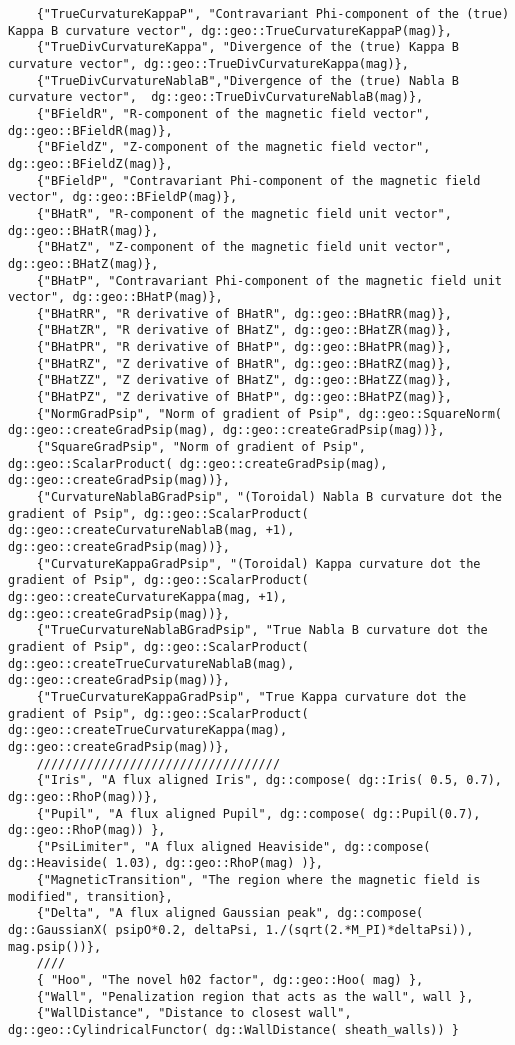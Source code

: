 \begin{verbatim}
    {"TrueCurvatureKappaP", "Contravariant Phi-component of the (true) Kappa B curvature vector", dg::geo::TrueCurvatureKappaP(mag)},
    {"TrueDivCurvatureKappa", "Divergence of the (true) Kappa B curvature vector", dg::geo::TrueDivCurvatureKappa(mag)},
    {"TrueDivCurvatureNablaB","Divergence of the (true) Nabla B curvature vector",  dg::geo::TrueDivCurvatureNablaB(mag)},
    {"BFieldR", "R-component of the magnetic field vector", dg::geo::BFieldR(mag)},
    {"BFieldZ", "Z-component of the magnetic field vector", dg::geo::BFieldZ(mag)},
    {"BFieldP", "Contravariant Phi-component of the magnetic field vector", dg::geo::BFieldP(mag)},
    {"BHatR", "R-component of the magnetic field unit vector", dg::geo::BHatR(mag)},
    {"BHatZ", "Z-component of the magnetic field unit vector", dg::geo::BHatZ(mag)},
    {"BHatP", "Contravariant Phi-component of the magnetic field unit vector", dg::geo::BHatP(mag)},
    {"BHatRR", "R derivative of BHatR", dg::geo::BHatRR(mag)},
    {"BHatZR", "R derivative of BHatZ", dg::geo::BHatZR(mag)},
    {"BHatPR", "R derivative of BHatP", dg::geo::BHatPR(mag)},
    {"BHatRZ", "Z derivative of BHatR", dg::geo::BHatRZ(mag)},
    {"BHatZZ", "Z derivative of BHatZ", dg::geo::BHatZZ(mag)},
    {"BHatPZ", "Z derivative of BHatP", dg::geo::BHatPZ(mag)},
    {"NormGradPsip", "Norm of gradient of Psip", dg::geo::SquareNorm( dg::geo::createGradPsip(mag), dg::geo::createGradPsip(mag))},
    {"SquareGradPsip", "Norm of gradient of Psip", dg::geo::ScalarProduct( dg::geo::createGradPsip(mag), dg::geo::createGradPsip(mag))},
    {"CurvatureNablaBGradPsip", "(Toroidal) Nabla B curvature dot the gradient of Psip", dg::geo::ScalarProduct( dg::geo::createCurvatureNablaB(mag, +1), dg::geo::createGradPsip(mag))},
    {"CurvatureKappaGradPsip", "(Toroidal) Kappa curvature dot the gradient of Psip", dg::geo::ScalarProduct( dg::geo::createCurvatureKappa(mag, +1), dg::geo::createGradPsip(mag))},
    {"TrueCurvatureNablaBGradPsip", "True Nabla B curvature dot the gradient of Psip", dg::geo::ScalarProduct( dg::geo::createTrueCurvatureNablaB(mag), dg::geo::createGradPsip(mag))},
    {"TrueCurvatureKappaGradPsip", "True Kappa curvature dot the gradient of Psip", dg::geo::ScalarProduct( dg::geo::createTrueCurvatureKappa(mag), dg::geo::createGradPsip(mag))},
    //////////////////////////////////
    {"Iris", "A flux aligned Iris", dg::compose( dg::Iris( 0.5, 0.7), dg::geo::RhoP(mag))},
    {"Pupil", "A flux aligned Pupil", dg::compose( dg::Pupil(0.7), dg::geo::RhoP(mag)) },
    {"PsiLimiter", "A flux aligned Heaviside", dg::compose( dg::Heaviside( 1.03), dg::geo::RhoP(mag) )},
    {"MagneticTransition", "The region where the magnetic field is modified", transition},
    {"Delta", "A flux aligned Gaussian peak", dg::compose( dg::GaussianX( psipO*0.2, deltaPsi, 1./(sqrt(2.*M_PI)*deltaPsi)), mag.psip())},
    ////
    { "Hoo", "The novel h02 factor", dg::geo::Hoo( mag) },
    {"Wall", "Penalization region that acts as the wall", wall },
    {"WallDistance", "Distance to closest wall", dg::geo::CylindricalFunctor( dg::WallDistance( sheath_walls)) }
\end{verbatim}

